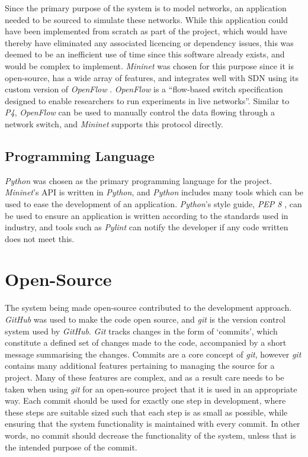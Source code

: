 Since the primary purpose of the system is to model networks, an application needed to be sourced to simulate these networks.
While this application could have been implemented from scratch as part of the project, which would have thereby have eliminated any associated licencing or dependency issues, this was deemed to be an inefficient use of time since this software already exists, and would be complex to implement.
\textit{Mininet} was chosen for this purpose since it is open-source, has a wide array of features, and integrates well with SDN using its custom version of \textit{OpenFlow} \cite{mininet_openflow}.
\textit{OpenFlow} is a ``flow-based switch specification designed to enable researchers to run experiments in live networks''.
Similar to \textit{P4}, \textit{OpenFlow} can be used to manually control the data flowing through a network switch, and \textit{Mininet} supports this protocol directly.

\subsection{Programming Language}

\textit{Python} \cite{python} was chosen as the primary programming language for the project.
\textit{Mininet}'s API is written in \textit{Python}, and \textit{Python} includes many tools which can be used to ease the development of an application.
\textit{Python}'s style guide, \textit{PEP 8} \cite{python_pep8}, can be used to ensure an application is written according to the standards used in industry, and tools such as \textit{Pylint} can notify the developer if any code written does not meet this.

\section{Open-Source}
\label{open_source}

The system being made open-source contributed to the development approach.
\textit{GitHub} \cite{github} was used to make the code open source, and \textit{git} \cite{git} is the version control system used by \textit{GitHub}.
\textit{Git} tracks changes in the form of `commits', which constitute a defined set of changes made to the code, accompanied by a short message summarising the changes.
Commits are a core concept of \textit{git}, however \textit{git} contains many additional features pertaining to managing the source for a project.
Many of these features are complex, and as a result care needs to be taken when using \textit{git} for an open-source project that it is used in an appropriate way.
Each commit should be used for exactly one step in development, where these steps are suitable sized such that each step is as small as possible, while ensuring that the system functionality is maintained with every commit.
In other words, no commit should decrease the functionality of the system, unless that is the intended purpose of the commit.

